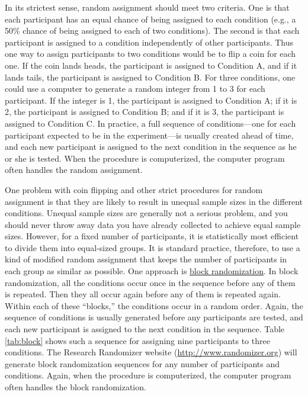 \documentclass[
]{krantz}
\begin{document}
In its strictest sense, random assignment should meet two criteria. One is that each participant has an equal chance of being assigned to each condition (e.g., a 50\% chance of being assigned to each of two conditions). The second is that each participant is assigned to a condition independently of other participants. Thus one way to assign participants to two conditions would be to flip a coin for each one. If the coin lands heads, the participant is assigned to Condition A, and if it lands tails, the participant is assigned to Condition B. For three conditions, one could use a computer to generate a random integer from 1 to 3 for each participant. If the integer is 1, the participant is assigned to Condition A; if it is 2, the participant is assigned to Condition B; and if it is 3, the participant is assigned to Condition C. In practice, a full sequence of conditions---one for each participant expected to be in the experiment---is usually created ahead of time, and each new participant is assigned to the next condition in the sequence as he or she is tested. When the procedure is computerized, the computer program often handles the random assignment.

One problem with coin flipping and other strict procedures for random assignment is that they are likely to result in unequal sample sizes in the different conditions. Unequal sample sizes are generally not a serious problem, and you should never throw away data you have already collected to achieve equal sample sizes. However, for a fixed number of participants, it is statistically most efficient to divide them into equal-sized groups. It is standard practice, therefore, to use a kind of modified random assignment that keeps the number of participants in each group as similar as possible. One approach is \protect\hyperlink{block-randomization}{block randomization}. In block randomization, all the conditions occur once in the sequence before any of them is repeated. Then they all occur again before any of them is repeated again. Within each of these ``blocks,'' the conditions occur in a random order. Again, the sequence of conditions is usually generated before any participants are tested, and each new participant is assigned to the next condition in the sequence. Table \ref{tab:block} shows such a sequence for assigning nine participants to three conditions. The Research Randomizer website (\url{http://www.randomizer.org}) will generate block randomization sequences for any number of participants and conditions. Again, when the procedure is computerized, the computer program often handles the block randomization.
\end{document}
